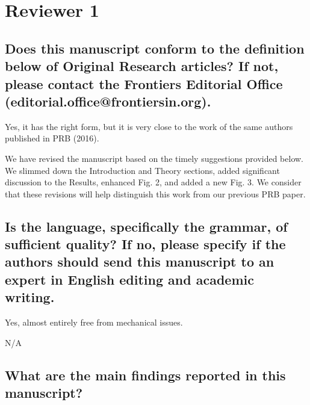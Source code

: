 \documentclass{article}
\begin{document}
\section{Reviewer 1}


\subsection{Does this manuscript conform to the definition below of Original
Research articles? If not, please contact the Frontiers Editorial Office
(editorial.office@frontiersin.org).}

Yes, it has the right form, but it is very close to the work of the same authors
published in PRB (2016).

\begin{shaded}
We have revised the manuscript based on the timely suggestions provided below. We slimmed down the Introduction and Theory sections, added significant discussion to the Results, enhanced Fig. 2, and added a new Fig. 3. We consider that these revisions will help distinguish this work from our previous PRB paper. 
\end{shaded}


\subsection{Is the language, specifically the grammar, of sufficient quality?
If no, please specify if the authors should send this manuscript to an expert in
English editing and academic writing.}

Yes, almost entirely free from mechanical issues.

\begin{shaded}
N/A
\end{shaded}


\subsection{What are the main findings reported in this manuscript?}
\end{document}
